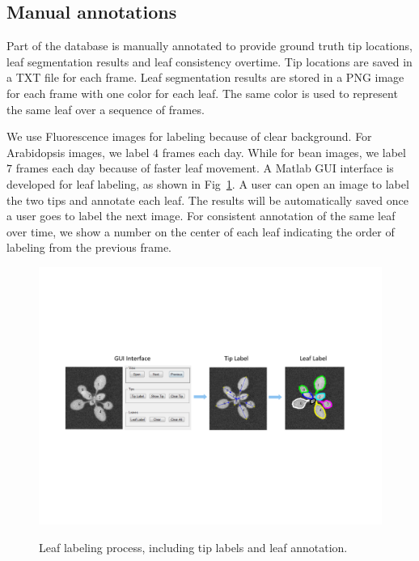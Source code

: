 \subsection{Manual annotations}
Part of the database is manually annotated to provide ground truth tip locations, leaf segmentation results and leaf consistency overtime.
Tip locations are saved in a TXT file for each frame.
Leaf segmentation results are stored in a PNG image for each frame with one color for each leaf.
The same color is used to represent the same leaf over a sequence of frames.

We use Fluorescence images for labeling because of clear background.
For Arabidopsis images, we label $4$ frames each day.
While for bean images, we label $7$ frames each day because of faster leaf movement.
A Matlab GUI interface is developed for leaf labeling, as shown in Fig~\ref{fig:label}.
A user can open an image to label the two tips and annotate each leaf.
The results will be automatically saved once a user goes to label the next image.
For consistent annotation of the same leaf over time, we show a number on the center of each leaf indicating the order of labeling from the previous frame.

\begin{figure}
\centering
\includegraphics[width=.98\textwidth]{Figures/labeling}\\
\caption{Leaf labeling process, including tip labels and leaf annotation.}
\label{fig:label}
\end{figure}

